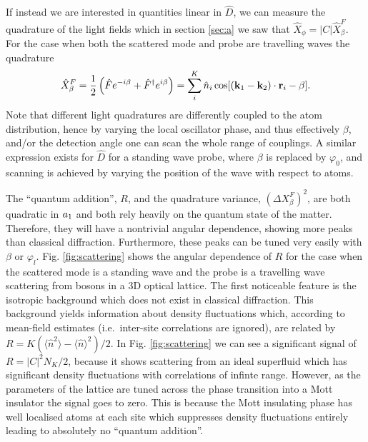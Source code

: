 If instead we are interested in quantities linear in $\hat{D}$, we can
measure the quadrature of the light fields which in section
\ref{sec:a} we saw that $\hat{X}_\phi = |C| \hat{X}^F_\beta$. For the
case when both the scattered mode and probe are travelling waves the
quadrature
\begin{equation} 
  \hat{X}^F_\beta = \frac{1}{2} \left( \hat{F} e^{-i \beta} +
    \hat{F}^\dagger e^{i \beta} \right) = \sum_i^K \hat{n}_i\cos[(\mathbf{k}_1 - \mathbf{k}_2) \cdot
  \mathbf{r}_i - \beta].
\end{equation} 
Note that different light quadratures are differently coupled to the
atom distribution, hence by varying the local oscillator phase, and
thus effectively $\beta$, and/or the detection angle one can scan the
whole range of couplings. A similar expression exists for $\hat{D}$
for a standing wave probe, where $\beta$ is replaced by $\varphi_0$,
and scanning is achieved by varying the position of the wave with
respect to atoms.

The ``quantum addition'', $R$, and the quadrature variance, $(\Delta
X^F_\beta)^2$, are both quadratic in $a_1$ and both rely heavily on
the quantum state of the matter. Therefore, they will have a
nontrivial angular dependence, showing more peaks than classical
diffraction. Furthermore, these peaks can be tuned very easily with
$\beta$ or $\varphi_l$. Fig. \ref{fig:scattering} shows the angular
dependence of $R$ for the case when the scattered mode is a standing
wave and the probe is a travelling wave scattering from bosons in a 3D
optical lattice. The first noticeable feature is the isotropic
background which does not exist in classical diffraction. This
background yields information about density fluctuations which,
according to mean-field estimates (i.e.~inter-site correlations are
ignored), are related by $R = K( \langle \hat{n}^2 \rangle - \langle
\hat{n} \rangle^2 )/2$. In Fig. \ref{fig:scattering} we can see a
significant signal of $R = |C|^2 N_K/2$, because it shows scattering
from an ideal superfluid which has significant density fluctuations
with correlations of infinte range. However, as the parameters of the
lattice are tuned across the phase transition into a Mott insulator
the signal goes to zero. This is because the Mott insulating phase has
well localised atoms at each site which suppresses density
fluctuations entirely leading to absolutely no ``quantum addition''.

